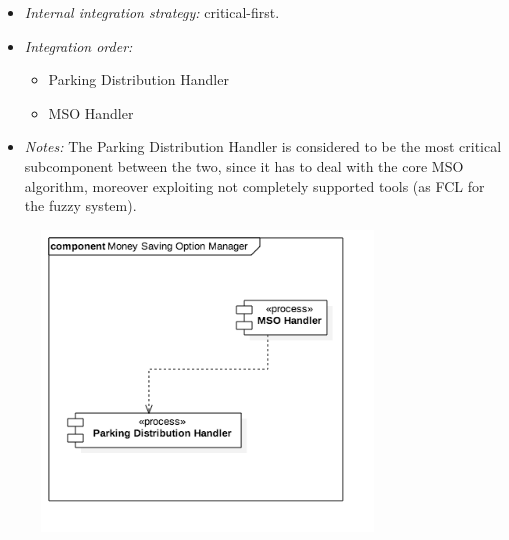 			\begin{itemize}[label={},leftmargin=*,noitemsep,topsep=0pt]
				\item \textit{Internal integration strategy:} critical-first.
				\item \textit{Integration order:}
					\begin{itemize}[noitemsep]
						\item Parking Distribution Handler
						\item MSO Handler
					\end{itemize}
				\item \textit{Notes: } The Parking Distribution Handler is considered to be the most critical subcomponent between the two, since it has to deal with the core MSO algorithm, moreover exploiting not completely supported tools (as FCL for the fuzzy system).
			\end{itemize}
			\begin{figure}[h]
				\includegraphics[width=250pt, center]{img/integration_strategy/subcomponents/money_saving_option_manager.png}
			\end{figure}
		\FloatBarrier

